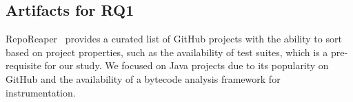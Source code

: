 






\subsection{Artifacts for RQ1}
\label{rq1:artifacts}
RepoReaper~\cite{reporeaper} provides a curated list of GitHub projects with the ability to sort based on project properties, such as the availability of test suites, which is a pre-requisite for our study. 
We focused on Java projects due to its popularity on GitHub and the availability of a bytecode analysis framework for instrumentation. 



